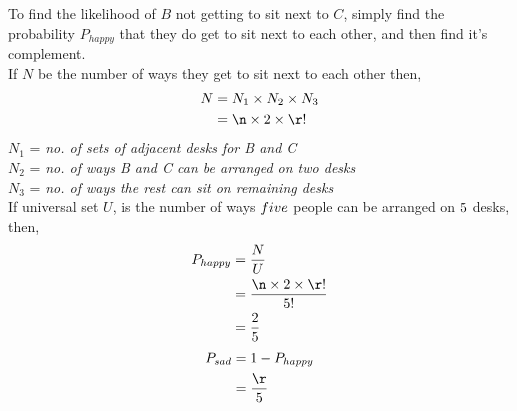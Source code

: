\begin{solution}[\halfpage]
  To find the likelihood of $B$ not getting to sit next to $C$, simply
  find the probability $P_{happy}$ that they do get to sit next to each 
  other, and then find it's complement.\\
  If $N$ be the number of ways they get to sit next to each other then, 
  \begin{align}
    N &= N_1\times N_2\times N_3 \\
      &= \n\times 2\times \r! 
  \end{align}
  $N_1$ = \textit{{no. of sets of adjacent desks for B and C}} \\
  $N_2$ = \textit{{no. of ways B and C can be arranged on two desks}} \\
  $N_3$ = \textit{{no. of ways the rest can sit on remaining desks}} \\
  
  If universal set $U$, is the number of ways $five$ people can be 
  arranged on $5$ desks, then,
  \begin{align}
    P_{happy} &= \dfrac{N}{U} \\
              &= \dfrac{\n\times 2\times \r!}{\vbfour!} \\
              &= \dfrac{2}{\vbfour}
  \end{align}
  \begin{align}
    P_{sad} &= 1 - P_{happy} \\
            &= \dfrac{\r}{\vbfour}
  \end{align}
  
\end{solution}

